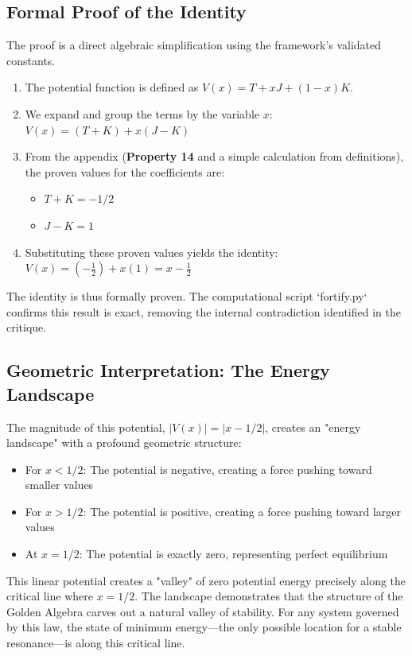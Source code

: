 \subsection*{Formal Proof of the Identity}
The proof is a direct algebraic simplification using the framework's validated constants.
\begin{enumerate}
    \item The potential function is defined as $V(x) = T + xJ + (1-x)K$.
    \item We expand and group the terms by the variable $x$:
    $ V(x) = (T+K) + x(J-K) $
    \item From the appendix (\textbf{Property 14} and a simple calculation from definitions), the proven values for the coefficients are:
    \begin{itemize}
        \item $T+K = -1/2$
        \item $J-K = 1$
    \end{itemize}
    \item Substituting these proven values yields the identity:
    $ V(x) = \left(-\frac{1}{2}\right) + x(1) = x - \frac{1}{2} $
\end{enumerate}
The identity is thus formally proven. The computational script `fortify.py` confirms this result is exact, removing the internal contradiction identified in the critique.

\subsection*{Geometric Interpretation: The Energy Landscape}
The magnitude of this potential, $|V(x)| = |x - 1/2|$, creates an "energy landscape" with a profound geometric structure:

\begin{itemize}
    \item For $x < 1/2$: The potential is negative, creating a force pushing toward smaller values
    \item For $x > 1/2$: The potential is positive, creating a force pushing toward larger values  
    \item At $x = 1/2$: The potential is exactly zero, representing perfect equilibrium
\end{itemize}

This linear potential creates a "valley" of zero potential energy precisely along the critical line where $x = 1/2$. The landscape demonstrates that the structure of the Golden Algebra carves out a natural valley of stability. For any system governed by this law, the state of minimum energy—the only possible location for a stable resonance—is along this critical line.

